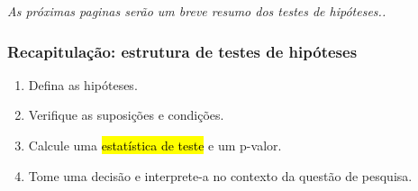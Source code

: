 
\begin{frame}

\vfill
\justifying
\textit{As próximas paginas serão um breve resumo dos testes de hipóteses..}

\vfill

\end{frame}


\begin{frame}
\frametitle{Recapitulação: estrutura de testes de hipóteses}

\begin{enumerate}
\justifying
\item Defina as hipóteses.
\justifying
\item Verifique as suposições e condições.
\justifying
\item Calcule uma \hl {estatística de teste} e um p-valor.
\justifying
\item Tome uma decisão e interprete-a no contexto da questão de pesquisa.

\end{enumerate}

\end{frame}


